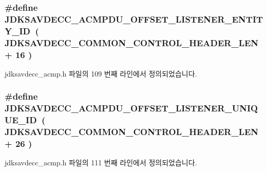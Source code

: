 \subsubsection[{\texorpdfstring{J\+D\+K\+S\+A\+V\+D\+E\+C\+C\+\_\+\+A\+C\+M\+P\+D\+U\+\_\+\+O\+F\+F\+S\+E\+T\+\_\+\+L\+I\+S\+T\+E\+N\+E\+R\+\_\+\+E\+N\+T\+I\+T\+Y\+\_\+\+ID}{JDKSAVDECC_ACMPDU_OFFSET_LISTENER_ENTITY_ID}}]{\setlength{\rightskip}{0pt plus 5cm}\#define J\+D\+K\+S\+A\+V\+D\+E\+C\+C\+\_\+\+A\+C\+M\+P\+D\+U\+\_\+\+O\+F\+F\+S\+E\+T\+\_\+\+L\+I\+S\+T\+E\+N\+E\+R\+\_\+\+E\+N\+T\+I\+T\+Y\+\_\+\+ID~( {\bf J\+D\+K\+S\+A\+V\+D\+E\+C\+C\+\_\+\+C\+O\+M\+M\+O\+N\+\_\+\+C\+O\+N\+T\+R\+O\+L\+\_\+\+H\+E\+A\+D\+E\+R\+\_\+\+L\+EN} + 16 )}\hypertarget{group__acmpdu_ga438673ace020114b77cb83936a2779b8}{}\label{group__acmpdu_ga438673ace020114b77cb83936a2779b8}


jdksavdecc\+\_\+acmp.\+h 파일의 109 번째 라인에서 정의되었습니다.

\subsubsection[{\texorpdfstring{J\+D\+K\+S\+A\+V\+D\+E\+C\+C\+\_\+\+A\+C\+M\+P\+D\+U\+\_\+\+O\+F\+F\+S\+E\+T\+\_\+\+L\+I\+S\+T\+E\+N\+E\+R\+\_\+\+U\+N\+I\+Q\+U\+E\+\_\+\+ID}{JDKSAVDECC_ACMPDU_OFFSET_LISTENER_UNIQUE_ID}}]{\setlength{\rightskip}{0pt plus 5cm}\#define J\+D\+K\+S\+A\+V\+D\+E\+C\+C\+\_\+\+A\+C\+M\+P\+D\+U\+\_\+\+O\+F\+F\+S\+E\+T\+\_\+\+L\+I\+S\+T\+E\+N\+E\+R\+\_\+\+U\+N\+I\+Q\+U\+E\+\_\+\+ID~( {\bf J\+D\+K\+S\+A\+V\+D\+E\+C\+C\+\_\+\+C\+O\+M\+M\+O\+N\+\_\+\+C\+O\+N\+T\+R\+O\+L\+\_\+\+H\+E\+A\+D\+E\+R\+\_\+\+L\+EN} + 26 )}\hypertarget{group__acmpdu_ga95d610e339117734620bcf94935d4a8d}{}\label{group__acmpdu_ga95d610e339117734620bcf94935d4a8d}


jdksavdecc\+\_\+acmp.\+h 파일의 111 번째 라인에서 정의되었습니다.

